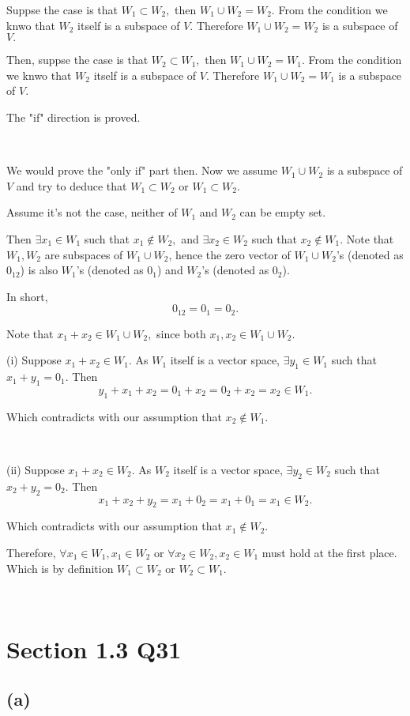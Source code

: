 \documentclass[12pt]{article}%
\begin{document}
Suppse the case is that $W_1\subset W_2,$ then $W_1 \cup W_2= W_2.$ From the condition we knwo that $W_2$ itself is a subspace of $V.$ Therefore $W_1 \cup W_2= W_2$ is a subspace of $V.$

Then, suppse the case is that $W_2\subset W_1,$ then $W_1 \cup W_2= W_1.$ From the condition we knwo that $W_2$ itself is a subspace of $V.$ Therefore $W_1 \cup W_2= W_1$ is a subspace of $V.$

The "if" direction is proved. 

~\ 

We would prove the "only if" part then. Now we assume $W_1 \cup W_2$ is a subspace of $V$ and try to deduce that $W_1 \subset W_2$ or $W_1 \subset W_2.$

Assume it's not the case, neither of $W_1$ and $W_2$ can be empty set. 

Then $\exists x_1 \in W_1$ such that $x_1 \notin W_2,$ and $\exists x_2 \in W_2$ such that $x_2 \notin W_1$. 
Note that $W_1,W_2$ are subspaces of $W_1 \cup W_2$, hence the zero vector of $W_1 \cup W_2$'s (denoted as $0_{12}$) is also $W_1$'s (denoted as $0_1$) and $W_2$'s (denoted as $0_2$). 

In short, $$0_{12}=0_1=0_2.$$

Note that $x_1+x_2 \in W_1 \cup W_2,$ since both $x_1,x_2 \in W_1 \cup W_2.$

(i) Suppose $x_1+x_2 \in W_1.$ As $W_1$ itself is a vector space, $\exists y_1 \in W_1$ such that $x_1+y_1 = 0_1.$ Then $$y_1+x_1+x_2=0_1+x_2=0_2+x_2=x_2 \in W_1.$$

Which contradicts with our assumption that $x_2 \notin W_1.$ 

~\ 

(ii) Suppose $x_1+x_2 \in W_2.$ As $W_2$ itself is a vector space, $\exists y_2 \in W_2$ such that $x_2+y_2 = 0_2.$ Then $$x_1+x_2+y_2=x_1+0_2=x_1+0_1=x_1 \in W_2.$$

Which contradicts with our assumption that $x_1 \notin W_2.$ 

Therefore, $\forall x_1 \in W_1, x_1 \in W_2$ or $\forall x_2 \in W_2, x_2 \in W_1$ must hold at the first place. Which is by definition $W_1 \subset W_2$ or $W_2 \subset W_1.$

~\ 

\section{Section 1.3 Q31}

\subsection{(a)} 
\end{document}
